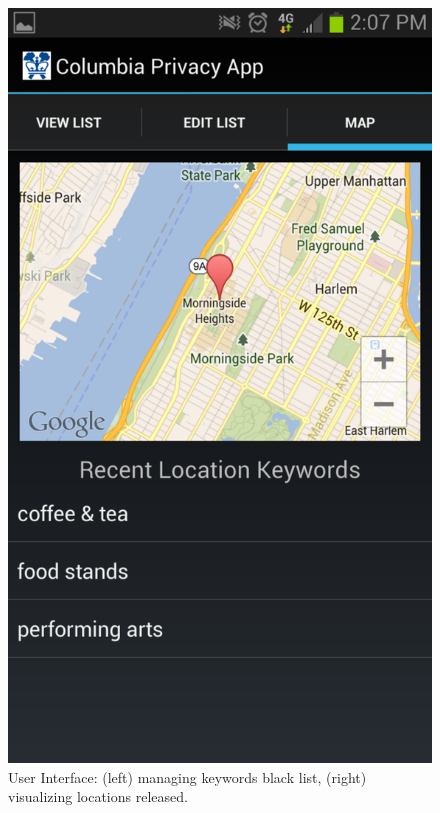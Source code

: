 \begin{figure}[!htb]
  \includegraphics[width=0.75\linewidth]{fig/keyword/screenshot_map.pdf}
\endminipage
\caption{User Interface: (left) managing keywords black list, (right) visualizing locations released.}
\end{figure}




